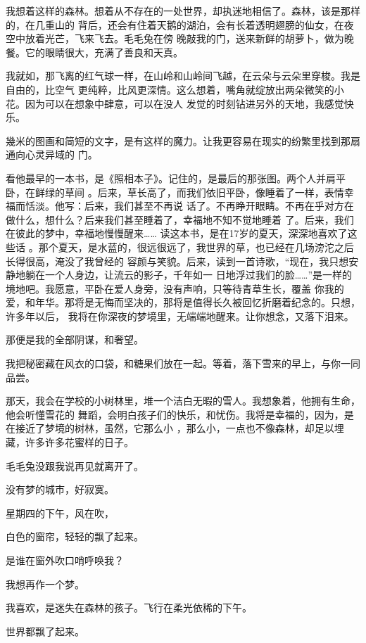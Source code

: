 \documentclass[12pt,a4paper]{article}
\begin{document}
		我想着这样的森林。想着从不存在的一处世界，却执迷地相信了。森林，该是那样的，在几重山的
	背后，还会有住着天鹅的湖泊，会有长着透明翅膀的仙女，在夜空中放着光芒，飞来飞去。毛毛兔在傍
	晚敲我的门，送来新鲜的胡萝卜，做为晚餐。它的眼睛很大，充满了善良和天真。

		我就如，那飞离的红气球一样，在山岭和山岭间飞越，在云朵与云朵里穿梭。我是自由的，比空气
	更纯粹，比风更深情。这么想着，嘴角就绽放出两朵微笑的小花。因为可以在想象中肆意，可以在没人
	发觉的时刻钻进另外的天地，我感觉快乐。

		幾米的图画和简短的文字，是有这样的魔力。让我更容易在现实的纷繁里找到那扇通向心灵异域的
	门。

		看他最早的一本书，是《照相本子》。记住的，是最后的那张图。两个人并肩平卧，在鲜绿的草间
	。后来，草长高了，而我们依旧平卧，像睡着了一样，表情幸福而恬淡。他写：后来，我们甚至不再说
	话了。不再睁开眼睛。不再在乎对方在做什么，想什么？后来我们甚至睡着了，幸福地不知不觉地睡着
	了。后来，我们在彼此的梦中，幸福地慢慢醒来…… 读这本书，是在17岁的夏天，深深地喜欢了这些话
	。那个夏天，是水蓝的，很远很远了，我世界的草，也已经在几场滂沱之后长得很高，淹没了我曾经的
	容颜与笑貌。后来，读到一首诗歌，“现在，我只想安静地躺在一个人身边，让流云的影子，千年如一
	日地浮过我们的脸……”是一样的境地吧。我愿意，平卧在爱人身旁，没有声响，只等待青草生长，覆盖
	你我的爱，和年华。那将是无悔而坚决的，那将是值得长久被回忆折磨着纪念的。只想，许多年以后，
	我将在你深夜的梦境里，无端端地醒来。让你想念，又落下泪来。

		那便是我的全部阴谋，和奢望。

		我把秘密藏在风衣的口袋，和糖果们放在一起。等着，落下雪来的早上，与你一同品尝。

		那天，我会在学校的小树林里，堆一个洁白无暇的雪人。我想象着，他拥有生命，他会听懂雪花的
	舞蹈，会明白孩子们的快乐，和忧伤。我将是幸福的，因为，是在接近了梦境的树林，虽然，它那么小
	，那么小，一点也不像森林，却足以埋藏，许多许多花蜜样的日子。

		毛毛兔没跟我说再见就离开了。

		没有梦的城市，好寂寞。

		星期四的下午，风在吹，

		白色的窗帘，轻轻的飘了起来。

		是谁在窗外吹口哨呼唤我？

		我想再作一个梦。

		我喜欢，是迷失在森林的孩子。飞行在柔光依稀的下午。

		世界都飘了起来。

	\endwriting
\end{document}
